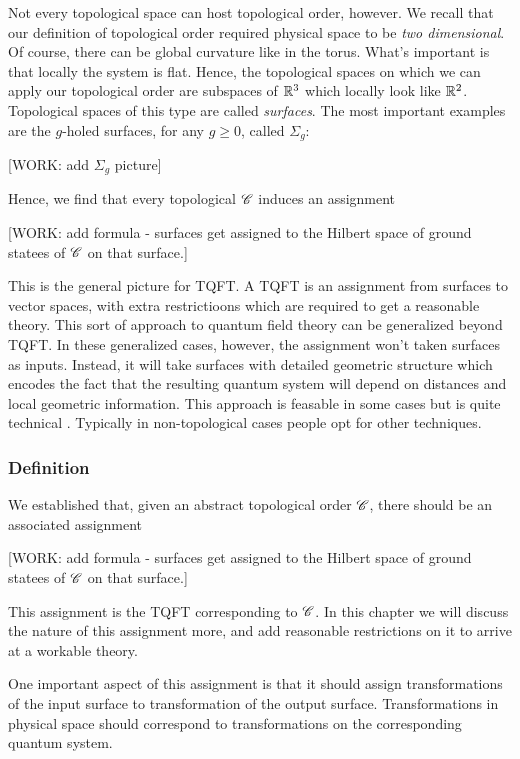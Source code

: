 \documentclass{article}
\theoremstyle{definition}
\numberwithin{figure}{section}
\begin{document}
Not every topological space can host topological order, however. We recall that our definition of topological order required physical space to be \textit{two dimensional}. Of course, there can be global curvature like in the torus. What's important is that locally the system is flat. Hence, the topological spaces on which we can apply our topological order are subspaces of $\mathbb{R}^3$ which locally look like $\mathbb{R}^2$. Topological spaces of this type are called \textit{surfaces}. The most important examples are the $g$-holed surfaces, for any $g\geq 0$, called $\Sigma_g$:

[WORK: add $\Sigma_g$ picture]

Hence, we find that every topological $\mathscr{C}$ induces an assignment

[WORK: add formula - surfaces get assigned to the Hilbert space of ground statees of $\mathscr{C}$ on that surface.]

This is the general picture for TQFT. A TQFT is an assignment from surfaces to vector spaces, with extra restrictioons which are required to get a reasonable theory. This sort of approach to quantum field theory can be generalized beyond TQFT. In these generalized cases, however, the assignment won't taken surfaces as inputs. Instead, it will take surfaces with detailed geometric structure which encodes the fact that the resulting quantum system will depend on distances and local geometric information. This approach is feasable in some cases but is quite technical \cite{segal1988definition}. Typically in non-topological cases people opt for other techniques.

\subsubsection{Definition}

We established that, given an abstract topological order $\mathscr{C}$, there should be an associated assignment

[WORK: add formula - surfaces get assigned to the Hilbert space of ground statees of $\mathscr{C}$ on that surface.]

This assignment is the TQFT corresponding to $\mathscr{C}$. In this chapter we will discuss the nature of this assignment more, and add reasonable restrictions on it to arrive at a workable theory.

One important aspect of this assignment is that it should assign transformations of the input surface to transformation of the output surface. Transformations in physical space should correspond to transformations on the corresponding quantum system.
\end{document}
